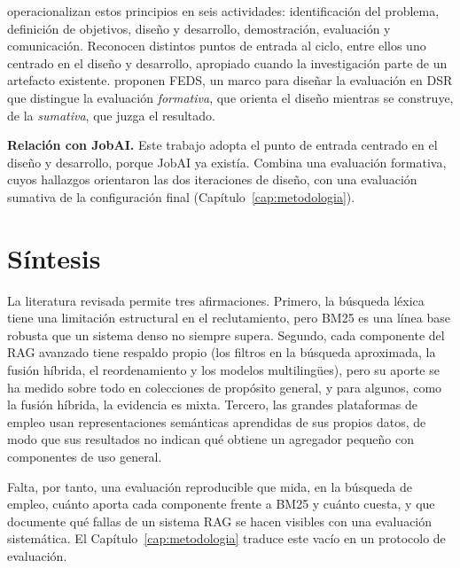 \citet{Peffers2007} operacionalizan estos principios en seis actividades: identificación del problema, definición de objetivos, diseño y desarrollo, demostración, evaluación y comunicación. Reconocen distintos puntos de entrada al ciclo, entre ellos uno centrado en el diseño y desarrollo, apropiado cuando la investigación parte de un artefacto existente. \citet{Venable2016} proponen FEDS, un marco para diseñar la evaluación en DSR que distingue la evaluación \emph{formativa}, que orienta el diseño mientras se construye, de la \emph{sumativa}, que juzga el resultado.

\textbf{Relación con JobAI.} Este trabajo adopta el punto de entrada centrado en el diseño y desarrollo, porque JobAI ya existía. Combina una evaluación formativa, cuyos hallazgos orientaron las dos iteraciones de diseño, con una evaluación sumativa de la configuración final (Capítulo~\ref{cap:metodologia}).

\section{Síntesis}

La literatura revisada permite tres afirmaciones. Primero, la búsqueda léxica tiene una limitación estructural en el reclutamiento, pero BM25 es una línea base robusta que un sistema denso no siempre supera. Segundo, cada componente del RAG avanzado tiene respaldo propio (los filtros en la búsqueda aproximada, la fusión híbrida, el reordenamiento y los modelos multilingües), pero su aporte se ha medido sobre todo en colecciones de propósito general, y para algunos, como la fusión híbrida, la evidencia es mixta. Tercero, las grandes plataformas de empleo usan representaciones semánticas aprendidas de sus propios datos, de modo que sus resultados no indican qué obtiene un agregador pequeño con componentes de uso general.

Falta, por tanto, una evaluación reproducible que mida, en la búsqueda de empleo, cuánto aporta cada componente frente a BM25 y cuánto cuesta, y que documente qué fallas de un sistema RAG se hacen visibles con una evaluación sistemática. El Capítulo~\ref{cap:metodologia} traduce este vacío en un protocolo de evaluación.

